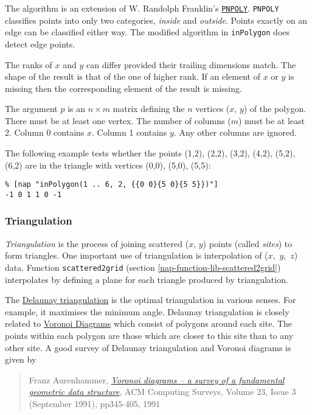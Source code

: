 The algorithm is an extension of W. Randolph Franklin's 
  \href{http://www.ecse.rpi.edu/Homepages/wrf/research/geom/pnpoly.html}
  {\texttt{PNPOLY}}. 
  \texttt{PNPOLY} classifies points into only two categories, 
  \textit{inside} and 
  \textit{outside}. Points exactly on an edge can be classified either
  way. The modified algorithm in 
  \texttt{inPolygon} does detect edge points.
  \par The ranks of 
  $x$ and 
  $y$ can differ provided their trailing dimensions match. The
  shape of the result is that of the one of higher rank. If an element
  of 
  $x$ or 
  $y$ is missing then the corresponding element of the result
  is missing.
  \par The argument 
  $p$ is an 
  $n\times  m$ matrix defining the 
  $n$ vertices ($x$, $y$) of the polygon. There must be at least one vertex. The
  number of columns ($m$) must be at least 2. Column 0 contains 
  $x$. Column 1 contains 
  $y$. Any other columns are ignored.
  \par The following example tests whether the points (1,2), (2,2),
  (3,2), (4,2), (5,2), (6,2) are in the triangle with vertices (0,0),
  (5,0), (5,5):
  \begin{verbatim}
% [nap "inPolygon(1 .. 6, 2, {{0 0}{5 0}{5 5}})"]
-1 0 1 1 0 -1
\end{verbatim}

\subsubsection{Triangulation}
    \label{function-Triangulation}

  \par 
  \textit{Triangulation} is the process of joining scattered ($x$, $y$) points (called 
  \textit{sites}) to form triangles. One important use of triangulation
  is interpolation of 
  \mbox{($x$, $y$, $z$)} data. Function 
  {\texttt{scattered2grid}} 
  (section \ref{nap-function-lib-scattered2grid})
    interpolates by defining a plane for each triangle produced by triangulation.
  \par The 
  \href{http://www.ics.uci.edu/$\sim$eppstein/gina/delaunay.html}{Delaunay triangulation} is the optimal triangulation in various senses. For
  example, it maximises the minimum angle. Delaunay triangulation is
  closely related to 
  \href{http://www.ics.uci.edu/$\sim$eppstein/gina/voronoi.html}{Voronoi Diagrams} which consist of polygons around each site. The points
  within each polygon are those which are closer to this site than to
  any other site. A good survey of Delaunay triangulation and Voronoi
  diagrams is given by
  \begin{quote}Franz Aurenhammer, 
  \href{http://portal.acm.org/citation.cfm?doid=116873.116880}{\emph{Voronoi diagrams -- a survey of a fundamental geometric data structure}}, ACM Computing Surveys, Volume 23, Issue 3 (September 1991),
  pp345-405, 1991\end{quote}

